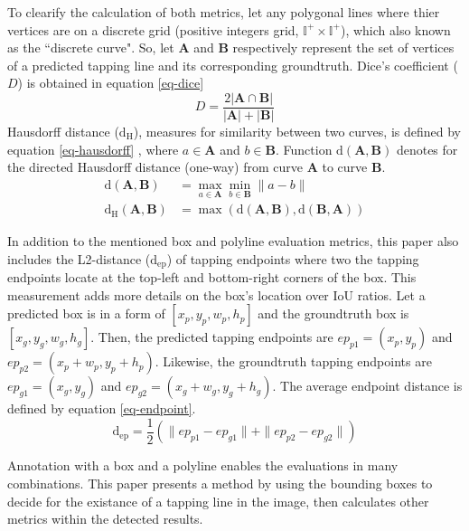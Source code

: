 \documentclass[default,pdflatex,iicol]{sn-jnl}%
\begin{document}
To clearify the calculation of both metrics, let any polygonal lines where thier vertices are on a discrete grid (positive integers grid, $\mathbb{I^+}\times \mathbb{I^+}$), which also known as the ``discrete curve". So, let $\textbf{A}$ and $\textbf{B}$ respectively represent the set of vertices of a predicted tapping line and its corresponding groundtruth. Dice's coefficient ($D$) is obtained in equation \ref{eq-dice}
\begin{equation}
D = \frac{2 \lvert \textbf{A} \cap \textbf{B} \rvert }{\lvert\textbf{A}\rvert+\lvert\textbf{B}\rvert}\label{eq-dice}
\end{equation}
Hausdorff distance ($\mathrm{d_H}$), measures for similarity between two curves, is defined by equation \ref{eq-hausdorff} \cite{Huttenlocher1993ComparingIU}, where $a \in \textbf{A}$ and $b \in \textbf{B}$. Function $\mathrm{d}(\textbf{A},\textbf{B})$ denotes for the directed Hausdorff distance (one-way) from curve \textbf{A} to curve \textbf{B}.
\begin{align}
\mathrm{d}(\textbf{A},\textbf{B}) &= \max_{a\in\textbf{A}} \min_{b\in\textbf{B}} \| a-b \|  \nonumber \\
\mathrm{d_H}(\textbf{A},\textbf{B}) &= \max (\mathrm{d}(\textbf{A},\textbf{B}), \mathrm{d}(\textbf{B},\textbf{A})) \label{eq-hausdorff}
\end{align}

In addition to the mentioned box and polyline evaluation metrics, this paper also includes the L2-distance ($\mathrm{d_{ep}}$) of tapping endpoints where two the tapping endpoints locate at the top-left and bottom-right corners of the box. This measurement adds more details on the box's location over IoU ratios. Let a predicted box is in a form of $[x_p, y_p, w_p, h_p]$ and the groundtruth box is $[x_g, y_g, w_g, h_g]$. Then, the predicted tapping endpoints are $ep_{p1} = (x_p, y_p)$ and $ep_{p2} = (x_p+w_p, y_p+h_p)$. Likewise, the groundtruth tapping endpoints are $ep_{g1} = (x_g, y_g)$ and $ep_{g2} = (x_g+w_g, y_g+h_g)$. The average endpoint distance is defined by equation \ref{eq-endpoint}.
\begin{equation}
\mathrm{d_{ep}} = \frac{1}{2} (\| ep_{p1}- ep_{g1} \| + \| ep_{p2}  - ep_{g2} \|) \label{eq-endpoint}
\end{equation}

Annotation with a box and a polyline enables the evaluations in many combinations. This paper presents a method by using the bounding boxes to decide for the existance of a tapping line in the image, then calculates other metrics within the detected results.
\end{document}
